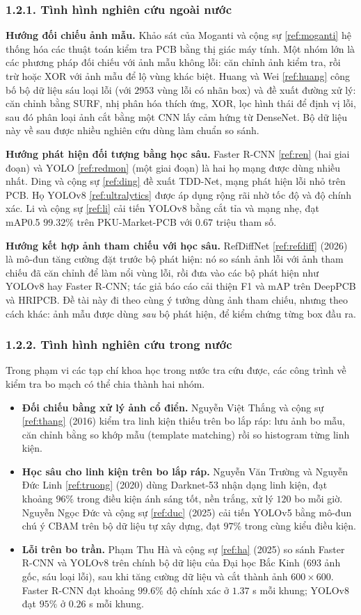 \documentclass[11pt,a4paper]{article}
\newcommand{\tlr}[1]{\ref{ref:#1}}
\newcommand{\chude}[1]{\subsubsection*{#1}}
\begin{document}
\chude{1.2.1. Tình hình nghiên cứu ngoài nước}

\textbf{Hướng đối chiếu ảnh mẫu.} Khảo sát của Moganti và cộng sự \tlr{moganti} hệ thống hóa các thuật toán kiểm tra PCB bằng thị giác máy tính. Một nhóm lớn là các phương pháp đối chiếu với ảnh mẫu không lỗi: căn chỉnh ảnh kiểm tra, rồi trừ hoặc XOR với ảnh mẫu để lộ vùng khác biệt. Huang và Wei \tlr{huang} công bố bộ dữ liệu sáu loại lỗi (với $2953$ vùng lỗi có nhãn box) và đề xuất đường xử lý: căn chỉnh bằng SURF, nhị phân hóa thích ứng, XOR, lọc hình thái để định vị lỗi, sau đó phân loại ảnh cắt bằng một CNN lấy cảm hứng từ DenseNet. Bộ dữ liệu này về sau được nhiều nghiên cứu dùng làm chuẩn so sánh.

\textbf{Hướng phát hiện đối tượng bằng học sâu.} Faster R-CNN \tlr{ren} (hai giai đoạn) và YOLO \tlr{redmon} (một giai đoạn) là hai họ mạng được dùng nhiều nhất. Ding và cộng sự \tlr{ding} đề xuất TDD-Net, mạng phát hiện lỗi nhỏ trên PCB. Họ YOLOv8 \tlr{ultralytics} được áp dụng rộng rãi nhờ tốc độ và độ chính xác. Li và cộng sự \tlr{li} cải tiến YOLOv8 bằng cắt tỉa và mạng nhẹ, đạt mAP0.5 $99.32\%$ trên PKU-Market-PCB với $0.67$ triệu tham số.

\textbf{Hướng kết hợp ảnh tham chiếu với học sâu.} RefDiffNet \tlr{refdiff} (2026) là mô-đun tăng cường đặt trước bộ phát hiện: nó so sánh ảnh lỗi với ảnh tham chiếu đã căn chỉnh để làm nổi vùng lỗi, rồi đưa vào các bộ phát hiện như YOLOv8 hay Faster R-CNN; tác giả báo cáo cải thiện F1 và mAP trên DeepPCB và HRIPCB. Đề tài này đi theo cùng ý tưởng dùng ảnh tham chiếu, nhưng theo cách khác: ảnh mẫu được dùng \emph{sau} bộ phát hiện, để kiểm chứng từng box đầu ra.

\chude{1.2.2. Tình hình nghiên cứu trong nước}

Trong phạm vi các tạp chí khoa học trong nước tra cứu được, các công trình về kiểm tra bo mạch có thể chia thành hai nhóm.

\begin{itemize}
  \item \textbf{Đối chiếu bằng xử lý ảnh cổ điển.} Nguyễn Việt Thắng và cộng sự \tlr{thang} (2016) kiểm tra linh kiện thiếu trên bo lắp ráp: lưu ảnh bo mẫu, căn chỉnh bằng so khớp mẫu (template matching) rồi so histogram từng linh kiện.
  \item \textbf{Học sâu cho linh kiện trên bo lắp ráp.} Nguyễn Văn Trường và Nguyễn Đức Linh \tlr{truong} (2020) dùng Darknet-53 nhận dạng linh kiện, đạt khoảng $96\%$ trong điều kiện ánh sáng tốt, nền trắng, xử lý $120$ bo mỗi giờ. Nguyễn Ngọc Đức và cộng sự \tlr{duc} (2025) cải tiến YOLOv5 bằng mô-đun chú ý CBAM trên bộ dữ liệu tự xây dựng, đạt $97\%$ trong cùng kiểu điều kiện.
  \item \textbf{Lỗi trên bo trần.} Phạm Thu Hà và cộng sự \tlr{ha} (2025) so sánh Faster R-CNN và YOLOv8 trên chính bộ dữ liệu của Đại học Bắc Kinh ($693$ ảnh gốc, sáu loại lỗi), sau khi tăng cường dữ liệu và cắt thành ảnh $600\times600$. Faster R-CNN đạt khoảng $99.6\%$ độ chính xác ở $1.37$ s mỗi khung; YOLOv8 đạt $95\%$ ở $0.26$ s mỗi khung.
\end{itemize}
\end{document}
